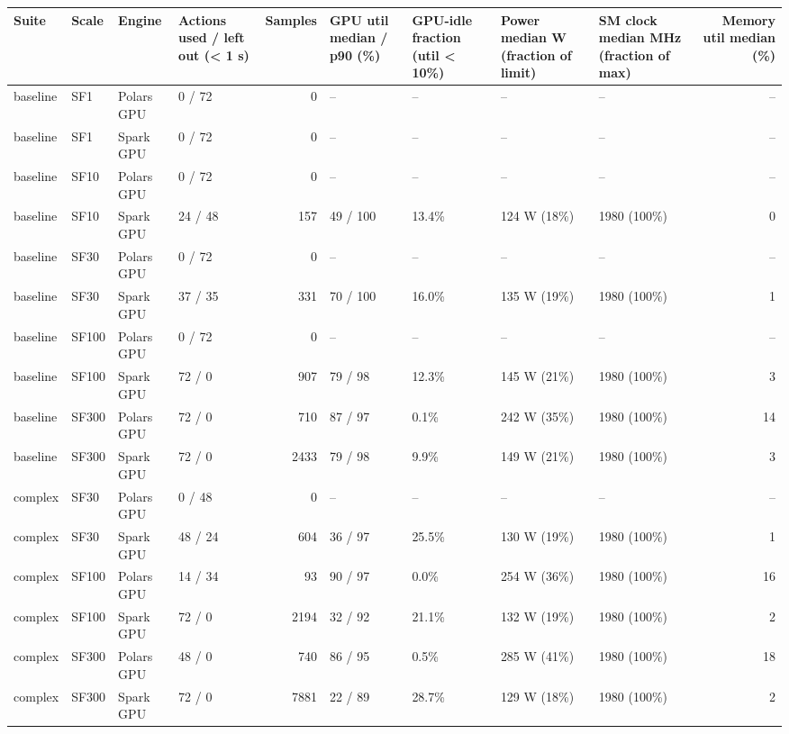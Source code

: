 \begin{longtable}{llllrllllr}
\toprule
Suite & Scale & Engine & Actions used / left out (< 1 s) & Samples & GPU util median / p90 (\%) & GPU-idle fraction (util < 10\%) & Power median W (fraction of limit) & SM clock median MHz (fraction of max) & Memory util median (\%) \\
\midrule
\endhead
\bottomrule
\endfoot
baseline & SF1 & Polars GPU & 0 / 72 & 0 & -- & -- & -- & -- & -- \\
baseline & SF1 & Spark GPU & 0 / 72 & 0 & -- & -- & -- & -- & -- \\
baseline & SF10 & Polars GPU & 0 / 72 & 0 & -- & -- & -- & -- & -- \\
baseline & SF10 & Spark GPU & 24 / 48 & 157 & 49 / 100 & 13.4\% & 124 W (18\%) & 1980 (100\%) & 0 \\
baseline & SF30 & Polars GPU & 0 / 72 & 0 & -- & -- & -- & -- & -- \\
baseline & SF30 & Spark GPU & 37 / 35 & 331 & 70 / 100 & 16.0\% & 135 W (19\%) & 1980 (100\%) & 1 \\
baseline & SF100 & Polars GPU & 0 / 72 & 0 & -- & -- & -- & -- & -- \\
baseline & SF100 & Spark GPU & 72 / 0 & 907 & 79 / 98 & 12.3\% & 145 W (21\%) & 1980 (100\%) & 3 \\
baseline & SF300 & Polars GPU & 72 / 0 & 710 & 87 / 97 & 0.1\% & 242 W (35\%) & 1980 (100\%) & 14 \\
baseline & SF300 & Spark GPU & 72 / 0 & 2433 & 79 / 98 & 9.9\% & 149 W (21\%) & 1980 (100\%) & 3 \\
complex & SF30 & Polars GPU & 0 / 48 & 0 & -- & -- & -- & -- & -- \\
complex & SF30 & Spark GPU & 48 / 24 & 604 & 36 / 97 & 25.5\% & 130 W (19\%) & 1980 (100\%) & 1 \\
complex & SF100 & Polars GPU & 14 / 34 & 93 & 90 / 97 & 0.0\% & 254 W (36\%) & 1980 (100\%) & 16 \\
complex & SF100 & Spark GPU & 72 / 0 & 2194 & 32 / 92 & 21.1\% & 132 W (19\%) & 1980 (100\%) & 2 \\
complex & SF300 & Polars GPU & 48 / 0 & 740 & 86 / 95 & 0.5\% & 285 W (41\%) & 1980 (100\%) & 18 \\
complex & SF300 & Spark GPU & 72 / 0 & 7881 & 22 / 89 & 28.7\% & 129 W (18\%) & 1980 (100\%) & 2 \\
\end{longtable}
